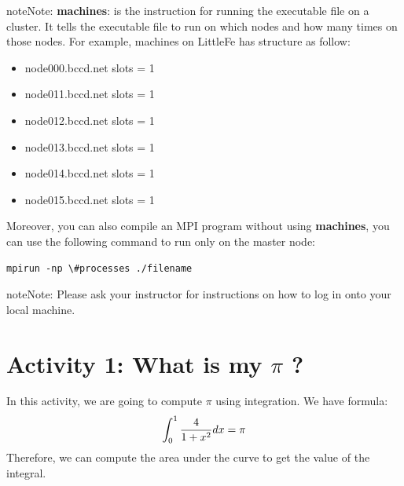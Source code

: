 \documentclass[letterpaper,10pt,openany,oneside]{sphinxmanual}
\begin{document}
\begin{notice}{note}{Note:}
\textbf{machines}: is the instruction for running the executable file on a cluster. It tells the executable file to run on which nodes and how many times on those nodes. For example, machines on LittleFe has structure as follow:
\begin{itemize}
\item {} 
node000.bccd.net    slots = 1

\item {} 
node011.bccd.net    slots = 1

\item {} 
node012.bccd.net    slots = 1

\item {} 
node013.bccd.net    slots = 1

\item {} 
node014.bccd.net    slots = 1

\item {} 
node015.bccd.net    slots = 1

\end{itemize}
\end{notice}

Moreover, you can also compile an MPI program without using \textbf{machines}, you can use the following command to run only on the master node:

\begin{Verbatim}[commandchars=\\\{\}]
mpirun -np \#processes ./filename
\end{Verbatim}

\begin{notice}{note}{Note:}
Please ask your instructor for instructions on how to log in onto your local machine.
\end{notice}


\section{Activity 1: What is my ${\pi}$ ?}
\label{CompileAndActivity/compileandactivity:activity-1-what-is-my}
In this activity, we are going to compute ${\pi}$ using integration. We have formula:
\begin{gather}
\begin{split}\int_0^1 \frac{4}{1 + x^2} dx = {\pi}\end{split}\notag
\end{gather}
Therefore, we can compute the area under the curve to get the value of the integral.
\end{document}
